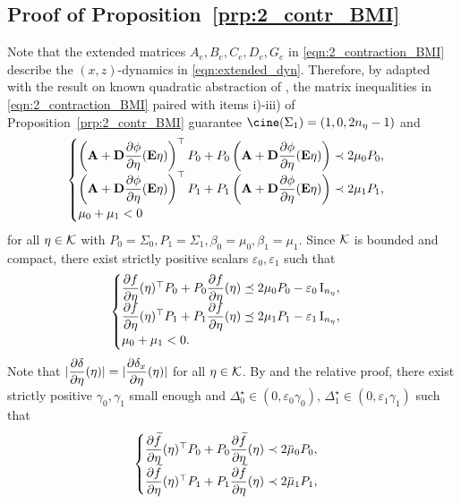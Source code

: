 \documentclass{ifacconf}
\begin{document}
\subsection{Proof of Proposition~\ref{prp:2_contr_BMI}}\label{sec:proof_prp1}
Note that the extended matrices $A_e, B_e, C_e, D_e, G_e$ in \eqref{eqn:2_contraction_BMI} describe the $(x,z)$-dynamics in \eqref{eqn:extended_dyn}. Therefore, by \citep[Theorem 2]{zoboli2024dynamic} adapted with the result on known quadratic abstraction of \citep[Corollary 2]{zoboli2024dynamic}, the matrix inequalities in \eqref{eqn:2_contraction_BMI} paired with items i)-iii) of Proposition~\ref{prp:2_contr_BMI} guarantee $\cine(\Sigma_1)=(1,0,2n_\eta-1)$ and
\begin{equation}
\label{eqn:2_contr_cond_closed_loop}
\begin{cases}
     \left( {\bf{A}}+ {\bf{D}}\dfrac{\partial \phi}{\partial \eta}({\bf{E}}\eta) \right)^\top P_0 +  P_0 \left({\bf{A}}+ {\bf{D}}\dfrac{\partial \phi}{\partial \eta}({\bf{E}}\eta) \right) \prec 2\mu_0 P_0,\\
     \left( {\bf{A}}+ {\bf{D}}\dfrac{\partial \phi}{\partial \eta}({\bf{E}}\eta) \right)^\top P_1 +  P_1 \left({\bf{A}}+ {\bf{D}}\dfrac{\partial \phi}{\partial \eta}({\bf{E}}\eta) \right) \prec 2\mu_1 P_1,\\
     \mu_0+\mu_1<0
\end{cases}
\end{equation}
for all $\eta\in{\mathcal{K}}$ with $P_0=\Sigma_0, P_1=\Sigma_1, \beta_0=\mu_0,\beta_1=\mu_1$. 
Since ${\mathcal{K}}$ is bounded and compact, there exist strictly positive scalars $\varepsilon_0,\varepsilon_1$ such that
\[
\begin{cases}
    \dfrac{\partial  f}{\partial \eta}(\eta)^\top P_0 +  P_0 \dfrac{\partial  f}{\partial \eta}(\eta) \preceq 2\mu_0 P_0 - \varepsilon_0 \operatorname{I}_{n_\eta},\\
    \dfrac{\partial  f}{\partial \eta}(\eta)^\top P_1 +  P_1 \dfrac{\partial  f}{\partial \eta}(\eta)\preceq 2\mu_1 P_1 - \varepsilon_1 \operatorname{I}_{n_\eta},\\
     \mu_0+\mu_1<0.
\end{cases}
\]
Note that $|\dfrac{\partial \delta}{\partial \eta}(\eta)|=|\dfrac{\partial \delta_x}{\partial \eta}(\eta)|$ for all $\eta \in {\mathcal{K}}$. By \citep[Lemma 8]{zoboli2024dynamic} and the relative proof, there exist strictly positive $\gamma_0,\gamma_1$ small enough and $\Delta^\star_0\in (0,\varepsilon_0\gamma_0),\,  \Delta^\star_1\in(0,\varepsilon_1\gamma_1)$ such that 
\[
\begin{cases}
    \pderiv{\widetilde f}{\eta}(\eta)^\top P_0 +  P_0 \pderiv{\widetilde f}{\eta}(\eta) \prec 2\overbar \mu_0 P_0,\\
     \pderiv{\widetilde f}{\eta}(\eta)^\top P_1 +  P_1 \pderiv{\widetilde f}{\eta}(\eta) \prec 2\overbar \mu_1 P_1,
\end{cases}
\]
\end{document}
